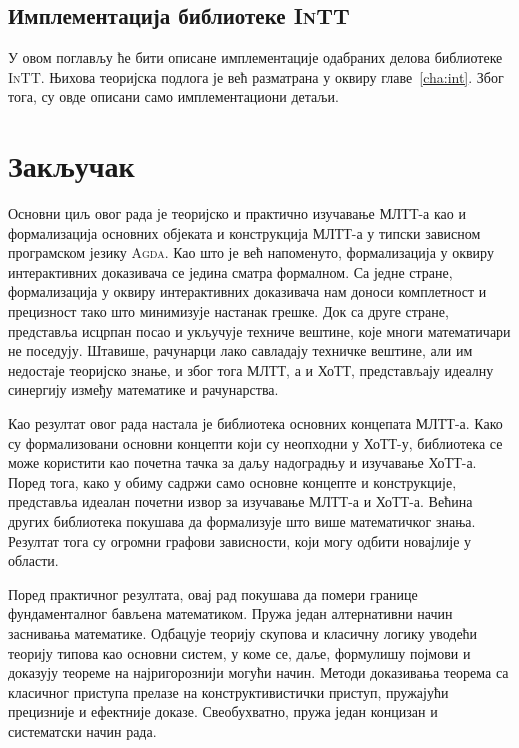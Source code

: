 \documentclass[12pt,oneside]{memoir}
\begin{document}
\section{Имплементација библиотеке \textsc{InTT}}

У овом поглављу ће бити описане имплементације одабраних делова библиотеке \textsc{InTT}.  Њихова теоријска подлога је већ разматрана у оквиру главе~\ref{cha:int}. Због тога, су овде описани само имплементациони детаљи.



\chapter{Закључак}

Основни циљ овог рада је теоријско и практично изучавање МЛТТ-а као и формализација основних објеката и конструкција МЛТТ-а у типски зависном програмском језику \textsc{Agda}. Као што је већ напоменуто, формализација у оквиру интерактивних доказивача се једина сматра формалном. Са једне стране, формализација у оквиру интерактивних доказивача нам доноси комплетност и прецизност тако што минимизује настанак грешке. Док са друге стране, представља исцрпан посао и укључује техниче вештине, које многи математичари не поседују. Штавише, рачунарци лако савладају техничке вештине, али им недостаје теоријско знање, и због тога МЛТТ, а и ХоТТ, представљају идеалну синергију између математике и рачунарства.

Као резултат овог рада настала је библиотека основних концепата МЛТТ-а. Како су формализовани основни концепти који су неопходни у ХоТТ-у, библиотека се може користити као почетна тачка за даљу надоградњу и изучавање ХоТТ-а. Поред тога, како у обиму садржи само основне концепте и конструкције, представља идеалан почетни извор за изучавање МЛТТ-а и ХоТТ-а. Већина других библиотека покушава да формализује што више математичког знања. Резултат тога су огромни графови зависности, који могу одбити новајлије у области. 

Поред практичног резултата, овај рад покушава да помери границе фундаменталног бављена математиком. Пружа један алтернативни начин заснивања математике. Одбацује теорију скупова и класичну логику уводећи теорију типова као основни систем, у коме се, даље, формулишу појмови и доказују теореме на најригорознији могући начин. Методи доказивања теорема са класичног приступа прелазе на конструктивистички приступ, пружајући прецизније и ефектније доказе. Свеобухватно, пружа један концизан и систематски начин рада.
\end{document}
